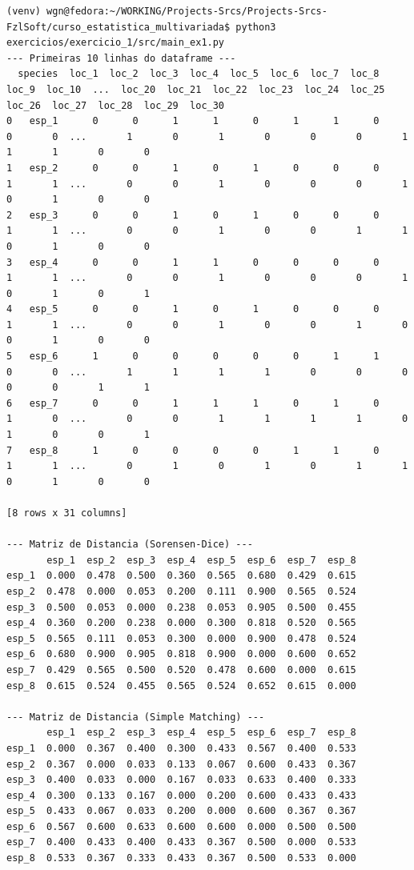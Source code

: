 \documentclass[11pt]{article}
\begin{document}
\begin{verbatim}
(venv) wgn@fedora:~/WORKING/Projects-Srcs/Projects-Srcs-FzlSoft/curso_estatistica_multivariada$ python3 exercicios/exercicio_1/src/main_ex1.py 
--- Primeiras 10 linhas do dataframe ---
  species  loc_1  loc_2  loc_3  loc_4  loc_5  loc_6  loc_7  loc_8  loc_9  loc_10  ...  loc_20  loc_21  loc_22  loc_23  loc_24  loc_25  loc_26  loc_27  loc_28  loc_29  loc_30
0   esp_1      0      0      1      1      0      1      1      0      0       0  ...       1       0       1       0       0       0       1       1       1       0       0
1   esp_2      0      0      1      0      1      0      0      0      1       1  ...       0       0       1       0       0       0       1       0       1       0       0
2   esp_3      0      0      1      0      1      0      0      0      1       1  ...       0       0       1       0       0       1       1       0       1       0       0
3   esp_4      0      0      1      1      0      0      0      0      1       1  ...       0       0       1       0       0       0       1       0       1       0       1
4   esp_5      0      0      1      0      1      0      0      0      1       1  ...       0       0       1       0       0       1       0       0       1       0       0
5   esp_6      1      0      0      0      0      0      1      1      0       0  ...       1       1       1       1       0       0       0       0       0       1       1
6   esp_7      0      0      1      1      1      0      1      0      1       0  ...       0       0       1       1       1       1       0       1       0       0       1
7   esp_8      1      0      0      0      0      1      1      0      1       1  ...       0       1       0       1       0       1       1       0       1       0       0

[8 rows x 31 columns]

--- Matriz de Distancia (Sorensen-Dice) ---
       esp_1  esp_2  esp_3  esp_4  esp_5  esp_6  esp_7  esp_8
esp_1  0.000  0.478  0.500  0.360  0.565  0.680  0.429  0.615
esp_2  0.478  0.000  0.053  0.200  0.111  0.900  0.565  0.524
esp_3  0.500  0.053  0.000  0.238  0.053  0.905  0.500  0.455
esp_4  0.360  0.200  0.238  0.000  0.300  0.818  0.520  0.565
esp_5  0.565  0.111  0.053  0.300  0.000  0.900  0.478  0.524
esp_6  0.680  0.900  0.905  0.818  0.900  0.000  0.600  0.652
esp_7  0.429  0.565  0.500  0.520  0.478  0.600  0.000  0.615
esp_8  0.615  0.524  0.455  0.565  0.524  0.652  0.615  0.000

--- Matriz de Distancia (Simple Matching) ---
       esp_1  esp_2  esp_3  esp_4  esp_5  esp_6  esp_7  esp_8
esp_1  0.000  0.367  0.400  0.300  0.433  0.567  0.400  0.533
esp_2  0.367  0.000  0.033  0.133  0.067  0.600  0.433  0.367
esp_3  0.400  0.033  0.000  0.167  0.033  0.633  0.400  0.333
esp_4  0.300  0.133  0.167  0.000  0.200  0.600  0.433  0.433
esp_5  0.433  0.067  0.033  0.200  0.000  0.600  0.367  0.367
esp_6  0.567  0.600  0.633  0.600  0.600  0.000  0.500  0.500
esp_7  0.400  0.433  0.400  0.433  0.367  0.500  0.000  0.533
esp_8  0.533  0.367  0.333  0.433  0.367  0.500  0.533  0.000


\end{verbatim}
\end{document}
